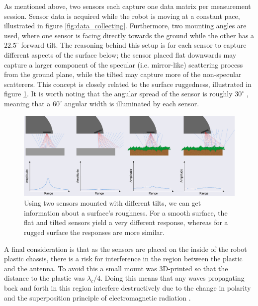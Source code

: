 As mentioned above, two sensors each capture one data matrix per measurement session. Sensor data is acquired while the robot is moving at a constant pace, illustrated in figure \ref{fig:data_collecting}. Furthermore, two mounting angles are used, where one sensor is facing directly towards the ground while the other has a $22.5^\circ$ forward tilt. The reasoning behind this setup is for each sensor to capture different aspects of the surface below; the sensor placed flat downwards may capture a larger component of the specular (i.e. mirror-like) scattering process from the ground plane, while the tilted may capture more of the non-specular scatterers. This concept is closely related to the surface ruggedness, illustrated in figure \ref{fig:reflections}. It is worth noting that the angular spread of the sensor is roughly $30^\circ$ \citep{acconeer_datasheet_a111}, meaning that a $60^\circ$ angular width is illuminated by each sensor. %
\begin{figure}[h]
	\centering
	\includegraphics[scale=0.9]{figs_temp/reflections.jpg}
	\caption{Using two sensors mounted with different tilts, we can get information about a surface's roughness. For a smooth surface, the flat and tilted sensors yield a very different response, whereas for a rugged surface the responses are more similar.}
	\label{fig:reflections}
\end{figure}

A final consideration is that as the sensors are placed on the inside of the robot plastic chassis, there is a risk for interference in the region between the plastic and the antenna. To avoid this a small mount was 3D-printed so that the distance to the plastic was $\lambda_c/4$. Doing this means that any waves propagating back and forth in this region interfere destructively due to the change in polarity and the superposition principle of electromagnetic radiation \citep{griffiths_2018}.

